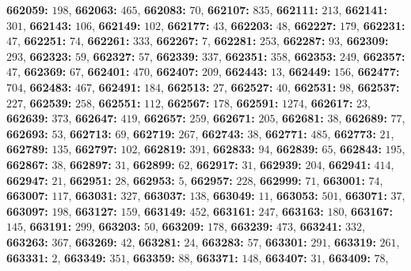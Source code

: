 \textsf{\bfseries 662059:} $198$, \textsf{\bfseries 662063:} $465$, \textsf{\bfseries 662083:} $70$, \textsf{\bfseries 662107:} $835$, \textsf{\bfseries 662111:} $213$, \textsf{\bfseries 662141:} $301$, \textsf{\bfseries 662143:} $106$, \textsf{\bfseries 662149:} $102$, \textsf{\bfseries 662177:} $43$, \textsf{\bfseries 662203:} $48$, \textsf{\bfseries 662227:} $179$, \textsf{\bfseries 662231:} $47$, \textsf{\bfseries 662251:} $74$, \textsf{\bfseries 662261:} $333$, \textsf{\bfseries 662267:} $7$, \textsf{\bfseries 662281:} $253$, \textsf{\bfseries 662287:} $93$, \textsf{\bfseries 662309:} $293$, \textsf{\bfseries 662323:} $59$, \textsf{\bfseries 662327:} $57$, \textsf{\bfseries 662339:} $337$, \textsf{\bfseries 662351:} $358$, \textsf{\bfseries 662353:} $249$, \textsf{\bfseries 662357:} $47$, \textsf{\bfseries 662369:} $67$, \textsf{\bfseries 662401:} $470$, \textsf{\bfseries 662407:} $209$, \textsf{\bfseries 662443:} $13$, \textsf{\bfseries 662449:} $156$, \textsf{\bfseries 662477:} $704$, \textsf{\bfseries 662483:} $467$, \textsf{\bfseries 662491:} $184$, \textsf{\bfseries 662513:} $27$, \textsf{\bfseries 662527:} $40$, \textsf{\bfseries 662531:} $98$, \textsf{\bfseries 662537:} $227$, \textsf{\bfseries 662539:} $258$, \textsf{\bfseries 662551:} $112$, \textsf{\bfseries 662567:} $178$, \textsf{\bfseries 662591:} $1274$, \textsf{\bfseries 662617:} $23$, \textsf{\bfseries 662639:} $373$, \textsf{\bfseries 662647:} $419$, \textsf{\bfseries 662657:} $259$, \textsf{\bfseries 662671:} $205$, \textsf{\bfseries 662681:} $38$, \textsf{\bfseries 662689:} $77$, \textsf{\bfseries 662693:} $53$, \textsf{\bfseries 662713:} $69$, \textsf{\bfseries 662719:} $267$, \textsf{\bfseries 662743:} $38$, \textsf{\bfseries 662771:} $485$, \textsf{\bfseries 662773:} $21$, \textsf{\bfseries 662789:} $135$, \textsf{\bfseries 662797:} $102$, \textsf{\bfseries 662819:} $391$, \textsf{\bfseries 662833:} $94$, \textsf{\bfseries 662839:} $65$, \textsf{\bfseries 662843:} $195$, \textsf{\bfseries 662867:} $38$, \textsf{\bfseries 662897:} $31$, \textsf{\bfseries 662899:} $62$, \textsf{\bfseries 662917:} $31$, \textsf{\bfseries 662939:} $204$, \textsf{\bfseries 662941:} $414$, \textsf{\bfseries 662947:} $21$, \textsf{\bfseries 662951:} $28$, \textsf{\bfseries 662953:} $5$, \textsf{\bfseries 662957:} $228$, \textsf{\bfseries 662999:} $71$, \textsf{\bfseries 663001:} $74$, \textsf{\bfseries 663007:} $117$, \textsf{\bfseries 663031:} $327$, \textsf{\bfseries 663037:} $138$, \textsf{\bfseries 663049:} $11$, \textsf{\bfseries 663053:} $501$, \textsf{\bfseries 663071:} $37$, \textsf{\bfseries 663097:} $198$, \textsf{\bfseries 663127:} $159$, \textsf{\bfseries 663149:} $452$, \textsf{\bfseries 663161:} $247$, \textsf{\bfseries 663163:} $180$, \textsf{\bfseries 663167:} $145$, \textsf{\bfseries 663191:} $299$, \textsf{\bfseries 663203:} $50$, \textsf{\bfseries 663209:} $178$, \textsf{\bfseries 663239:} $473$, \textsf{\bfseries 663241:} $332$, \textsf{\bfseries 663263:} $367$, \textsf{\bfseries 663269:} $42$, \textsf{\bfseries 663281:} $24$, \textsf{\bfseries 663283:} $57$, \textsf{\bfseries 663301:} $291$, \textsf{\bfseries 663319:} $261$, \textsf{\bfseries 663331:} $2$, \textsf{\bfseries 663349:} $351$, \textsf{\bfseries 663359:} $88$, \textsf{\bfseries 663371:} $148$, \textsf{\bfseries 663407:} $31$, \textsf{\bfseries 663409:} $78$, 
